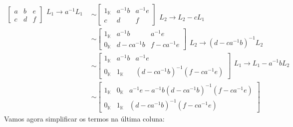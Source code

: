\documentclass[12pt]{article}
\newcommand{\cp}[1]{\mathbb{#1}}
\begin{document}
\begin{align*}
    \left[
        \begin{array}{cc|c}
            a & b & e\\
            c & d & f
        \end{array}
    \right]
    \begin{array}{l}
        L_1 \to a^{-1}L_1\\
        \phantom{x}
    \end{array} &\sim
    \left[
        \begin{array}{cc|c}
            1_\cp{K} & a^{-1}b & a^{-1}e\\
            c & d & f
        \end{array}
    \right]
    \begin{array}{l}
        \phantom{x}\\
        L_2 \to L_2 - cL_1
    \end{array}\\ &\sim
    \left[
        \begin{array}{cc|c}
            1_\cp{K} & a^{-1}b & a^{-1}e\\
            0_\cp{K} & d - ca^{-1}b & f - ca^{-1}e
        \end{array}
    \right]
    \begin{array}{l}
        \phantom{x}\\
        L_2 \to (d - ca^{-1}b)^{-1}L_2
    \end{array}\\ &\sim
    \left[
        \begin{array}{cc|c}
            1_\cp{K} & a^{-1}b & a^{-1}e\\
            0_\cp{K} & 1_\cp{K} & (d - ca^{-1}b)^{-1}(f - ca^{-1}e)
        \end{array}
    \right]
    \begin{array}{l}
        L_1 \to L_1 - a^{-1}bL_2\\
        \phantom{x}
    \end{array}\\ &\sim
    \left[
        \begin{array}{cc|c}
            1_\cp{K} & 0_\cp{K} & a^{-1}e - a^{-1}b(d - ca^{-1}b)^{-1}(f - ca^{-1}e)\\
            0_\cp{K} & 1_\cp{K} & (d - ca^{-1}b)^{-1}(f - ca^{-1}e)
        \end{array}
    \right]
\end{align*}
Vamos agora simplificar os termos na \'ultima coluna:
\end{document}
